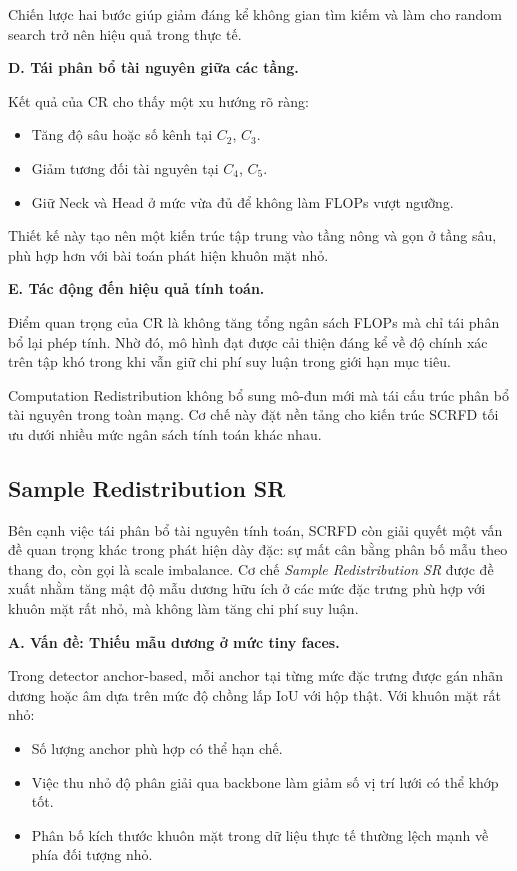 Chiến lược hai bước giúp giảm đáng kể không gian tìm kiếm và làm cho random search trở nên hiệu quả trong thực tế.

\medskip
\noindent\textbf{D. Tái phân bổ tài nguyên giữa các tầng.}

Kết quả của CR cho thấy một xu hướng rõ ràng:

\begin{itemize}
  \item Tăng độ sâu hoặc số kênh tại $C_2$, $C_3$.
  \item Giảm tương đối tài nguyên tại $C_4$, $C_5$.
  \item Giữ Neck và Head ở mức vừa đủ để không làm FLOPs vượt ngưỡng.
\end{itemize}

Thiết kế này tạo nên một kiến trúc tập trung vào tầng nông và gọn ở tầng sâu, phù hợp hơn với bài toán phát hiện khuôn mặt nhỏ.

\medskip
\noindent\textbf{E. Tác động đến hiệu quả tính toán.}

Điểm quan trọng của CR là không tăng tổng ngân sách FLOPs mà chỉ tái phân bổ lại phép tính. 
Nhờ đó, mô hình đạt được cải thiện đáng kể về độ chính xác trên tập khó trong khi vẫn giữ chi phí suy luận trong giới hạn mục tiêu.

\medskip
\noindent
Computation Redistribution không bổ sung mô-đun mới mà tái cấu trúc phân bổ tài nguyên trong toàn mạng.
Cơ chế này đặt nền tảng cho kiến trúc SCRFD tối ưu dưới nhiều mức ngân sách tính toán khác nhau. 

\subsection{Sample Redistribution SR}

Bên cạnh việc tái phân bổ tài nguyên tính toán, SCRFD còn giải quyết một vấn đề quan trọng khác trong phát hiện dày đặc: sự mất cân bằng phân bố mẫu theo thang đo, còn gọi là scale imbalance. 
Cơ chế \textit{Sample Redistribution SR} được đề xuất nhằm tăng mật độ mẫu dương hữu ích ở các mức đặc trưng phù hợp với khuôn mặt rất nhỏ, mà không làm tăng chi phí suy luận. \cite{guo2022scrfd}

\medskip
\noindent\textbf{A. Vấn đề: Thiếu mẫu dương ở mức tiny faces.}

Trong detector anchor-based, mỗi anchor tại từng mức đặc trưng được gán nhãn dương hoặc âm dựa trên mức độ chồng lấp IoU với hộp thật. 
Với khuôn mặt rất nhỏ:

\begin{itemize}
  \item Số lượng anchor phù hợp có thể hạn chế.
  \item Việc thu nhỏ độ phân giải qua backbone làm giảm số vị trí lưới có thể khớp tốt.
  \item Phân bố kích thước khuôn mặt trong dữ liệu thực tế thường lệch mạnh về phía đối tượng nhỏ.
\end{itemize}

